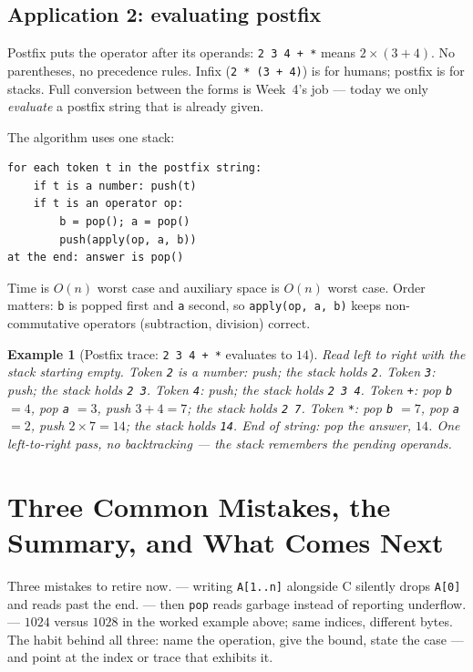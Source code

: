 \documentclass[11pt]{article}
\newtheorem{example}{Example}[section]
\begin{document}
\subsection{Application 2: evaluating postfix}

Postfix puts the operator after its operands: \texttt{2 3 4 + *} means $2 \times (3 + 4)$. No parentheses, no precedence rules. Infix (\texttt{2 * (3 + 4)}) is for humans; postfix is for stacks. Full conversion between the forms is Week~4's job --- today we only \emph{evaluate} a postfix string that is already given.

The algorithm uses one stack:
{\footnotesize
\begin{verbatim}
for each token t in the postfix string:
    if t is a number: push(t)
    if t is an operator op:
        b = pop(); a = pop()
        push(apply(op, a, b))
at the end: answer is pop()
\end{verbatim}
}
Time is $O(n)$ worst case and auxiliary space is $O(n)$ worst case. Order matters: \texttt{b} is popped first and \texttt{a} second, so \texttt{apply(op, a, b)} keeps non-commutative operators (subtraction, division) correct.

\begin{example}[Postfix trace: \texttt{2 3 4 + *} evaluates to $14$]
Read left to right with the stack starting empty. Token \texttt{2} is a number: push; the stack holds \texttt{2}. Token \texttt{3}: push; the stack holds \texttt{2 3}. Token \texttt{4}: push; the stack holds \texttt{2 3 4}. Token \texttt{+}: pop \texttt{b} $= 4$, pop \texttt{a} $= 3$, push $3 + 4 = 7$; the stack holds \texttt{2 7}. Token \texttt{*}: pop \texttt{b} $= 7$, pop \texttt{a} $= 2$, push $2 \times 7 = 14$; the stack holds \texttt{14}. End of string: pop the answer, $14$. One left-to-right pass, no backtracking --- the stack remembers the pending operands.
\end{example}


\section{Three Common Mistakes, the Summary, and What Comes Next}

Three mistakes to retire now.  --- writing \texttt{A[1..n]} alongside C silently drops \texttt{A[0]} and reads past the end.  --- then \texttt{pop} reads garbage instead of reporting underflow.  --- $1024$ versus $1028$ in the worked example above; same indices, different bytes. The habit behind all three: name the operation, give the bound, state the case --- and point at the index or trace that exhibits it.
\end{document}
